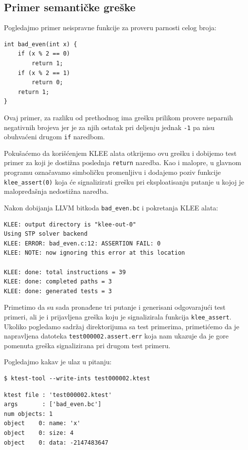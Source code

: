 \subsection{Primer semantičke greške}\label{primer-semantiux10dke-greux161ke}

Pogledajmo primer neispravne funkcije za proveru parnosti celog broja:

\begin{verbatim}
int bad_even(int x) {
    if (x % 2 == 0)
        return 1;
    if (x % 2 == 1)
        return 0;
    return 1;
}
\end{verbatim}

Ovaj primer, za razliku od prethodnog ima grešku prilikom provere neparnih negativnih brojeva jer je za njih ostatak pri deljenju jednak \texttt{-1} pa nisu obuhvaćeni drugom \texttt{if} naredbom.

Pokušaćemo da korišćenjem KLEE alata otkrijemo ovu grešku i dobijemo test primer za koji je dostižna poslednja \texttt{return} naredba. Kao i malopre, u glavnom programu označavamo simboličku promenljivu i dodajemo poziv funkcije \texttt{klee\_assert(0)} koja će signalizirati grešku pri eksploatisanju putanje u kojoj je malopređašnja nedostižna naredba.

Nakon dobijanja LLVM bitkoda \texttt{bad\_even.bc} i pokretanja KLEE alata:

\begin{verbatim}
KLEE: output directory is "klee-out-0"
Using STP solver backend
KLEE: ERROR: bad_even.c:12: ASSERTION FAIL: 0
KLEE: NOTE: now ignoring this error at this location

KLEE: done: total instructions = 39
KLEE: done: completed paths = 3
KLEE: done: generated tests = 3
\end{verbatim}

Primetimo da su sada pronađene tri putanje i generisani odgovarajući test primeri, ali je i prijavljena greška koju je signalizirala funkcija \texttt{klee\_assert}. Ukoliko pogledamo sadržaj direktorijuma sa test primerima, primetićemo da je napravljena datoteka \texttt{test000002.assert.err} koja nam ukazuje da je gore pomenuta greška signalizirana pri drugom test primeru.

Pogledajmo kakav je ulaz u pitanju:

\begin{verbatim}
$ ktest-tool --write-ints test000002.ktest
\end{verbatim}

\begin{verbatim}
ktest file : 'test000002.ktest'
args       : ['bad_even.bc']
num objects: 1
object    0: name: 'x'
object    0: size: 4
object    0: data: -2147483647
\end{verbatim}

